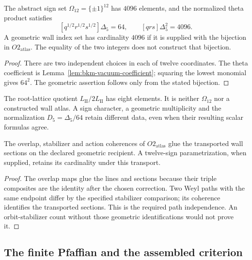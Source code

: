 \begin{theorem}
\label{thm:G-R1-R2}
The abstract sign set \(\Omega_{12}=\{\pm1\}^{12}\) has
\(4096\) elements, and the normalized theta product satisfies
\[
 [q^{1/2}r^{1/2}s^{1/2}]\Delta_5=64,
 \qquad [qrs]\Delta_5^2=4096.
\]
A geometric wall index set has cardinality \(4096\) if it is
supplied with the bijection in \(O2_{\mathrm{atlas}}\).
The equality of the two integers does not construct that bijection.
\end{theorem}
\begin{proof}
There are two independent choices in each of twelve coordinates.
The theta coefficient is Lemma~\ref{lem:bkm-vacuum-coefficient};
squaring the lowest monomial gives \(64^2\). The geometric
assertion follows only from the stated bijection.
\end{proof}

\begin{remark}
\label{rem:G-R1-R2}
The root-lattice quotient \(L_{\mathrm{II}}/2L_{\mathrm{II}}\)
has eight elements. It is neither \(\Omega_{12}\) nor a
constructed wall atlas. A sign character, a geometric multiplicity
and the normalization \(D_5=\Delta_5/64\) retain different data,
even when their resulting scalar formulas agree.
\end{remark}

\begin{theorem}
\label{thm:G-O2-orbit-transport}
The overlap, stabilizer and action coherences of
\(O2_{\mathrm{atlas}}\) glue the transported wall sections on
the declared geometric recipient. A twelve-sign parametrization,
when supplied, retains its cardinality under this transport.
\end{theorem}
\begin{proof}
The overlap maps glue the lines and sections because their triple
composites are the identity after the chosen correction. Two Weyl
paths with the same endpoint differ by the specified stabilizer
comparison; its coherence identifies the transported sections.
This is the required path independence. An orbit-stabilizer count
without those geometric identifications would not prove it.
\end{proof}

\subsection{The finite Pfaffian and the assembled criterion}

